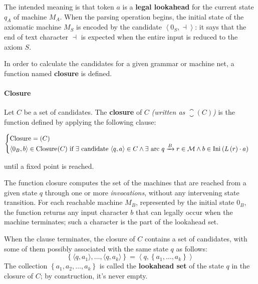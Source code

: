 \documentclass[english]{article}
\begin{document}
The intended meaning is that token \(a\) is a \textbf{legal lookahead} for the current state \(q_A\) of machine \(M_A\).
When the parsing operation begins, the initial state of the axiomatic machine \(M_S\) is encoded by the candidate \(\left\langle 0_S, \dashv \right\rangle\):
it says that the end of text character \(\dashv\) is expected when the entire input is reduced to the axiom \(S\).

In order to calculate the candidates for a given grammar or machine net, a function named \textbf{closure} is defined.

\paragraph{Closure}
\label{par:closure}

\begin{definition}[Closure]
  Let \(C\) be a set of candidates.
  The \textbf{closure} of \(C\) \textit{(written as \(\closure(C)\))} is the function defined by applying the following clause:

  \begin{gather*}
    \begin{cases}
      \closure = (C)                                                                                                                                                                                                                          \\
      \langle 0_B, b \rangle \in \closure(C) \ \text{if} \ \exists \ \text{candidate} \ \langle q,a \rangle \in C \land \exists \ \text{arc} \  q\xrightarrow{B} r \in \mathcal{M} \land b \in \Ini \left( L \left( r \right) \cdot a \right) \\
    \end{cases}
  \end{gather*}

  until a fixed point is reached.
\end{definition}

\bigskip
The function closure computes the set of the machines that are reached from a given state \(q\) through one or more \textit{invocations}, without any intervening state transition.
For each reachable machine \(M_B\), represented by the initial state \(0_B\), the function returns any input character \(b\) that can legally occur when the machine terminates;
such a character is the part of the lookahead set.

When the clause terminates, the closure of \(C\) contains a set of candidates, with some of them possibly associated with the same state \(q\) as follows:
\[ \left\{ \langle q, a_1 \rangle, \ldots, \langle q, a_k \rangle \right\} = \left\langle q, \left\{ a_1, \ldots, a_k \right\} \right\rangle \]
The collection \(\left\{ a_1, a_2, \ldots, a_k \right\}\) is called the \textbf{lookahead set} of the state \(q\) in the closure of \(C\);
by construction, it's never empty.
\end{document}
